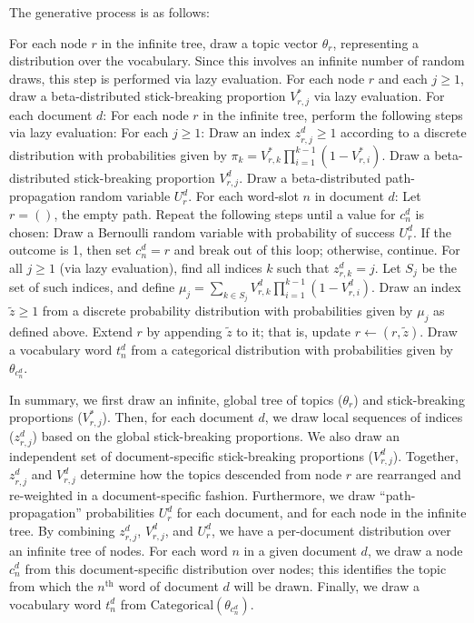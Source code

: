 \documentclass{article}
\newcommand{\nth}{^{\text{th}}}
\begin{document}
The generative process is as follows:
\begin{outline}[enumerate]
\1 For each node $r$ in the infinite tree, draw a topic vector $\theta_r$, representing a distribution over the vocabulary.
Since this involves an infinite number of random draws, this step is performed via lazy evaluation.
\1 For each node $r$ and each $j \geq 1$, draw a beta-distributed stick-breaking proportion $V^*_{r,j}$ via lazy evaluation.
\1 For each document $d$:
  \2 For each node $r$ in the infinite tree, perform the following steps via lazy evaluation:
    \3 For each $j \geq 1$:
      \4 Draw an index $z^d_{r,j} \geq 1$ according to a discrete distribution with probabilities given by $\pi_k = V^*_{r,k} \prod_{i=1}^{k-1} (1-V^*_{r,i})$.
      \4 Draw a beta-distributed stick-breaking proportion $V^d_{r,j}$.
    \3 Draw a beta-distributed path-propagation random variable $U^d_r$.
  \2 For each word-slot $n$ in document $d$:
    \3 Let $r = ()$, the empty path.
    \3 Repeat the following steps until a value for $c^d_n$ is chosen:
      \4 Draw a Bernoulli random variable with probability of success $U^d_r$.
      \4 If the outcome is 1, then set $c^d_n = r$ and break out of this loop; otherwise, continue.
      \4 For all $j \geq 1$ (via lazy evaluation), find all indices $k$ such that $z^d_{r,k} = j$.  Let $S_j$ be the set of such indices, and define $\mu_j = \sum_{k \in S_j} V^d_{r,k} \prod_{i=1}^{k-1} (1-V^d_{r,i})$.
      \4 Draw an index $\tilde z \geq 1$ from a discrete probability distribution with probabilities given by $\mu_j$ as defined above.
      \4 Extend $r$ by appending $\tilde z$ to it; that is, update $r \gets (r, \tilde z)$.
    \3 Draw a vocabulary word $t^d_n$ from a categorical distribution with probabilities given by $\theta_{c^d_n}$.
\end{outline}

In summary, we first draw an infinite, global tree of topics ($\theta_r$) and stick-breaking proportions ($V^*_{r,j}$).
Then, for each document $d$, we draw local sequences of indices ($z^d_{r,j}$) based on the global stick-breaking proportions.
We also draw an independent set of document-specific stick-breaking proportions ($V^d_{r,j}$).
Together, $z^d_{r,j}$ and $V^d_{r,j}$ determine how the topics descended from node $r$ are rearranged and re-weighted in a document-specific fashion.
Furthermore, we draw ``path-propagation'' probabilities $U^d_r$ for each document, and for each node in the infinite tree.
By combining $z^d_{r,j}$, $V^d_{r,j}$, and $U^d_r$, we have a per-document distribution over an infinite tree of nodes.
For each word $n$ in a given document $d$, we draw a node $c^d_n$ from this document-specific distribution over nodes;
this identifies the topic from which the $n\nth$ word of document $d$ will be drawn.
Finally, we draw a vocabulary word $t^d_n$ from ${\text{Categorical}(\theta_{c^d_n})}$.
\end{document}

